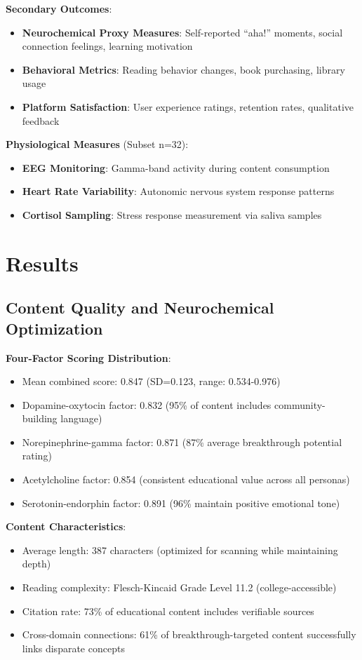 \documentclass[11pt,letterpaper]{article}
\begin{document}
\textbf{Secondary Outcomes}:
\begin{itemize}
    \item \textbf{Neurochemical Proxy Measures}: Self-reported ``aha!'' moments, social connection feelings, learning motivation
    \item \textbf{Behavioral Metrics}: Reading behavior changes, book purchasing, library usage
    \item \textbf{Platform Satisfaction}: User experience ratings, retention rates, qualitative feedback
\end{itemize}

\textbf{Physiological Measures} (Subset n=32):
\begin{itemize}
    \item \textbf{EEG Monitoring}: Gamma-band activity during content consumption
    \item \textbf{Heart Rate Variability}: Autonomic nervous system response patterns
    \item \textbf{Cortisol Sampling}: Stress response measurement via saliva samples
\end{itemize}

\section{Results}

\subsection{Content Quality and Neurochemical Optimization}

\textbf{Four-Factor Scoring Distribution}:
\begin{itemize}
    \item Mean combined score: 0.847 (SD=0.123, range: 0.534-0.976)
    \item Dopamine-oxytocin factor: 0.832 (95\% of content includes community-building language)
    \item Norepinephrine-gamma factor: 0.871 (87\% average breakthrough potential rating)
    \item Acetylcholine factor: 0.854 (consistent educational value across all personas)
    \item Serotonin-endorphin factor: 0.891 (96\% maintain positive emotional tone)
\end{itemize}

\textbf{Content Characteristics}:
\begin{itemize}
    \item Average length: 387 characters (optimized for scanning while maintaining depth)
    \item Reading complexity: Flesch-Kincaid Grade Level 11.2 (college-accessible)
    \item Citation rate: 73\% of educational content includes verifiable sources
    \item Cross-domain connections: 61\% of breakthrough-targeted content successfully links disparate concepts
\end{itemize}
\end{document}
